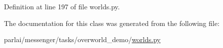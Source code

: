 Definition at line 197 of file worlds.\+py.



The documentation for this class was generated from the following file\+:\begin{DoxyCompactItemize}
\item 
parlai/messenger/tasks/overworld\+\_\+demo/\hyperlink{parlai_2messenger_2tasks_2overworld__demo_2worlds_8py}{worlds.\+py}\end{DoxyCompactItemize}
